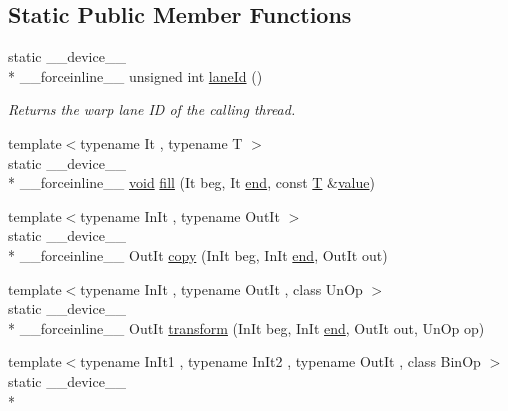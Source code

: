 \subsection*{Static Public Member Functions}
\begin{DoxyCompactItemize}
\item 
static \-\_\-\-\_\-device\-\_\-\-\_\- \\*
\-\_\-\-\_\-forceinline\-\_\-\-\_\- unsigned int \hyperlink{structcv_1_1gpu_1_1device_1_1Warp_aa48f497ab15265f89f508468d9c12074}{lane\-Id} ()
\begin{DoxyCompactList}\small\item\em Returns the warp lane I\-D of the calling thread. \end{DoxyCompactList}\item 
{\footnotesize template$<$typename It , typename T $>$ }\\static \-\_\-\-\_\-device\-\_\-\-\_\- \\*
\-\_\-\-\_\-forceinline\-\_\-\-\_\- \hyperlink{legacy_8hpp_a8bb47f092d473522721002c86c13b94e}{void} \hyperlink{structcv_1_1gpu_1_1device_1_1Warp_a609940ad1d1dc2b85bce1f1e540d089d}{fill} (It beg, It \hyperlink{legacy_8hpp_ab21668ff869102944cbf3bb534bba27d}{end}, const \hyperlink{calib3d_8hpp_a3efb9551a871ddd0463079a808916717}{T} \&\hyperlink{highgui__c_8h_ad4670c92695d4327c21292905a803901}{value})
\item 
{\footnotesize template$<$typename In\-It , typename Out\-It $>$ }\\static \-\_\-\-\_\-device\-\_\-\-\_\- \\*
\-\_\-\-\_\-forceinline\-\_\-\-\_\- Out\-It \hyperlink{structcv_1_1gpu_1_1device_1_1Warp_ac2ad04e0b268dc2ccbc175130f4943ca}{copy} (In\-It beg, In\-It \hyperlink{legacy_8hpp_ab21668ff869102944cbf3bb534bba27d}{end}, Out\-It out)
\item 
{\footnotesize template$<$typename In\-It , typename Out\-It , class Un\-Op $>$ }\\static \-\_\-\-\_\-device\-\_\-\-\_\- \\*
\-\_\-\-\_\-forceinline\-\_\-\-\_\- Out\-It \hyperlink{structcv_1_1gpu_1_1device_1_1Warp_a6f32591e58ebbf6372ab69870b479eee}{transform} (In\-It beg, In\-It \hyperlink{legacy_8hpp_ab21668ff869102944cbf3bb534bba27d}{end}, Out\-It out, Un\-Op op)
\item 
{\footnotesize template$<$typename In\-It1 , typename In\-It2 , typename Out\-It , class Bin\-Op $>$ }\\static \-\_\-\-\_\-device\-\_\-\-\_\- \\*

\end{DoxyCompactItemize}
